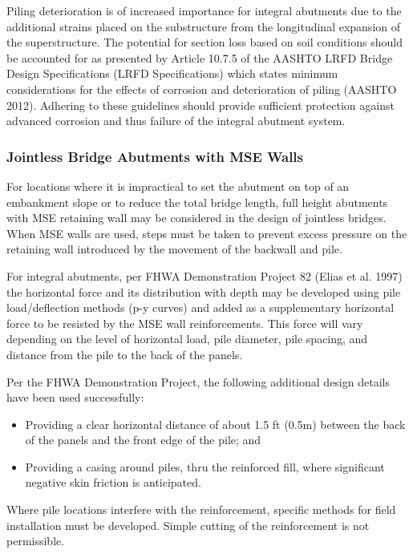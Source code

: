 Piling deterioration is of increased importance for integral abutments due to the additional strains placed on the
substructure from the longitudinal expansion of the superstructure. The potential for section loss based on soil
conditions should be accounted for as presented by Article 10.7.5 of the AASHTO LRFD Bridge Design Specifications
(LRFD Specifications) which states minimum considerations for the effects of corrosion and deterioration of piling
(AASHTO 2012). Adhering to these guidelines should provide sufficient protection against advanced corrosion and
thus failure of the integral abutment system.

\subsubsection{Jointless Bridge Abutments with MSE Walls}
For locations where it is impractical to set the abutment on top of an embankment slope or to reduce the total
bridge length, full height abutments with MSE retaining wall may be considered in the design of jointless bridges. When MSE walls are used, steps must be taken to prevent excess pressure on the retaining wall introduced by the
movement of the backwall and pile.

For integral abutments, per FHWA Demonstration Project 82 (Elias et al. 1997) the horizontal force and its
distribution with depth may be developed using pile load/deflection methods (p-y curves) and added as a
supplementary horizontal force to be resisted by the MSE wall reinforcements. This force will vary depending on the
level of horizontal load, pile diameter, pile spacing, and distance from the pile to the back of the panels.

Per the FHWA Demonstration Project, the following additional design details have been used successfully:

\begin{itemize}
  \item Providing a clear horizontal distance of about 1.5 ft (0.5m) between the back of the panels and the front edge of the pile; and
  \item Providing a casing around piles, thru the reinforced fill, where significant negative skin friction is anticipated.
\end{itemize}

Where pile locations interfere with the reinforcement, specific methods for field installation must be developed. Simple cutting of the reinforcement is not permissible.

